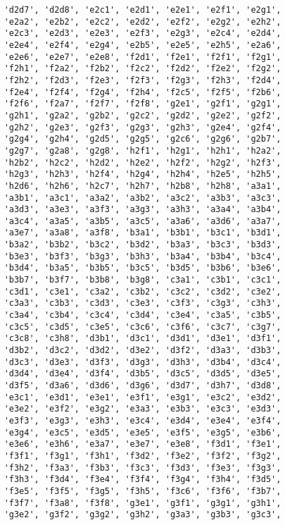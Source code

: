 \begin{verbatim}
    'd2d7', 'd2d8', 'e2c1', 'e2d1', 'e2e1', 'e2f1', 'e2g1',
    'e2a2', 'e2b2', 'e2c2', 'e2d2', 'e2f2', 'e2g2', 'e2h2',
    'e2c3', 'e2d3', 'e2e3', 'e2f3', 'e2g3', 'e2c4', 'e2d4',
    'e2e4', 'e2f4', 'e2g4', 'e2b5', 'e2e5', 'e2h5', 'e2a6',
    'e2e6', 'e2e7', 'e2e8', 'f2d1', 'f2e1', 'f2f1', 'f2g1',
    'f2h1', 'f2a2', 'f2b2', 'f2c2', 'f2d2', 'f2e2', 'f2g2',
    'f2h2', 'f2d3', 'f2e3', 'f2f3', 'f2g3', 'f2h3', 'f2d4',
    'f2e4', 'f2f4', 'f2g4', 'f2h4', 'f2c5', 'f2f5', 'f2b6',
    'f2f6', 'f2a7', 'f2f7', 'f2f8', 'g2e1', 'g2f1', 'g2g1',
    'g2h1', 'g2a2', 'g2b2', 'g2c2', 'g2d2', 'g2e2', 'g2f2',
    'g2h2', 'g2e3', 'g2f3', 'g2g3', 'g2h3', 'g2e4', 'g2f4',
    'g2g4', 'g2h4', 'g2d5', 'g2g5', 'g2c6', 'g2g6', 'g2b7',
    'g2g7', 'g2a8', 'g2g8', 'h2f1', 'h2g1', 'h2h1', 'h2a2',
    'h2b2', 'h2c2', 'h2d2', 'h2e2', 'h2f2', 'h2g2', 'h2f3',
    'h2g3', 'h2h3', 'h2f4', 'h2g4', 'h2h4', 'h2e5', 'h2h5',
    'h2d6', 'h2h6', 'h2c7', 'h2h7', 'h2b8', 'h2h8', 'a3a1',
    'a3b1', 'a3c1', 'a3a2', 'a3b2', 'a3c2', 'a3b3', 'a3c3',
    'a3d3', 'a3e3', 'a3f3', 'a3g3', 'a3h3', 'a3a4', 'a3b4',
    'a3c4', 'a3a5', 'a3b5', 'a3c5', 'a3a6', 'a3d6', 'a3a7',
    'a3e7', 'a3a8', 'a3f8', 'b3a1', 'b3b1', 'b3c1', 'b3d1',
    'b3a2', 'b3b2', 'b3c2', 'b3d2', 'b3a3', 'b3c3', 'b3d3',
    'b3e3', 'b3f3', 'b3g3', 'b3h3', 'b3a4', 'b3b4', 'b3c4',
    'b3d4', 'b3a5', 'b3b5', 'b3c5', 'b3d5', 'b3b6', 'b3e6',
    'b3b7', 'b3f7', 'b3b8', 'b3g8', 'c3a1', 'c3b1', 'c3c1',
    'c3d1', 'c3e1', 'c3a2', 'c3b2', 'c3c2', 'c3d2', 'c3e2',
    'c3a3', 'c3b3', 'c3d3', 'c3e3', 'c3f3', 'c3g3', 'c3h3',
    'c3a4', 'c3b4', 'c3c4', 'c3d4', 'c3e4', 'c3a5', 'c3b5',
    'c3c5', 'c3d5', 'c3e5', 'c3c6', 'c3f6', 'c3c7', 'c3g7',
    'c3c8', 'c3h8', 'd3b1', 'd3c1', 'd3d1', 'd3e1', 'd3f1',
    'd3b2', 'd3c2', 'd3d2', 'd3e2', 'd3f2', 'd3a3', 'd3b3',
    'd3c3', 'd3e3', 'd3f3', 'd3g3', 'd3h3', 'd3b4', 'd3c4',
    'd3d4', 'd3e4', 'd3f4', 'd3b5', 'd3c5', 'd3d5', 'd3e5',
    'd3f5', 'd3a6', 'd3d6', 'd3g6', 'd3d7', 'd3h7', 'd3d8',
    'e3c1', 'e3d1', 'e3e1', 'e3f1', 'e3g1', 'e3c2', 'e3d2',
    'e3e2', 'e3f2', 'e3g2', 'e3a3', 'e3b3', 'e3c3', 'e3d3',
    'e3f3', 'e3g3', 'e3h3', 'e3c4', 'e3d4', 'e3e4', 'e3f4',
    'e3g4', 'e3c5', 'e3d5', 'e3e5', 'e3f5', 'e3g5', 'e3b6',
    'e3e6', 'e3h6', 'e3a7', 'e3e7', 'e3e8', 'f3d1', 'f3e1',
    'f3f1', 'f3g1', 'f3h1', 'f3d2', 'f3e2', 'f3f2', 'f3g2',
    'f3h2', 'f3a3', 'f3b3', 'f3c3', 'f3d3', 'f3e3', 'f3g3',
    'f3h3', 'f3d4', 'f3e4', 'f3f4', 'f3g4', 'f3h4', 'f3d5',
    'f3e5', 'f3f5', 'f3g5', 'f3h5', 'f3c6', 'f3f6', 'f3b7',
    'f3f7', 'f3a8', 'f3f8', 'g3e1', 'g3f1', 'g3g1', 'g3h1',
    'g3e2', 'g3f2', 'g3g2', 'g3h2', 'g3a3', 'g3b3', 'g3c3',

\end{verbatim}

